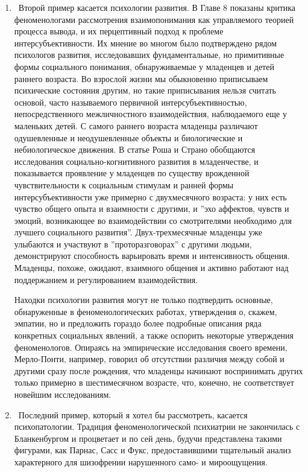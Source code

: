 \documentclass[11pt]{book}
\begin{document}
\begin{enumerate}
  \item\ Второй пример касается психологии развития. В Главе 8 показаны критика феноменологами рассмотрения взаимопонимания как управляемого теорией процесса вывода, и их перцептивный подход к проблеме интерсубъективности. Их мнение во многом было подтверждено рядом психологов развития, исследовавших фундаментальные, но примитивные формы социального понимания, обнаруживаемые у младенцев и детей раннего возраста. Во взрослой жизни мы обыкновенно приписываем психические состояния другим, но такие приписывания нельзя считать основой, часто называемого первичной интерсубъективностью, непосредственного межличностного взаимодействия, наблюдаемого еще у маленьких детей. С самого раннего возраста младенцы различают одушевленные и неодушевленные объекты и биологические и небиологическое движения. В статье Роша и Страно обобщаются исследования социально-когнитивного развития в младенчестве, и показывается проявление у младенцев по существу врожденной чувствительности к социальным стимулам и ранней формы интерсубъективности уже примерно с двухмесячного возраста: у них есть чувство общего опыта и взаимности с другими, и ''эхо аффектов, чувств и эмоций, возникающее во взаимодействии со смотрителями необходимо для лучшего социального развития''. Двух-трехмесячные младенцы уже улыбаются и участвуют в ''проторазговорах'' с другими людьми, демонстрируют способность варьировать время и интенсивность общения. Младенцы, похоже, ожидают, взаимного общения и активно работают над поддержанием и регулированием взаимодействия.

Находки психологии развития могут не только подтвердить основные, обнаруженные в феноменологических работах, утверждения о, скажем, эмпатии, но и предложить гораздо более подробные описания ряда конкретных социальных явлений, а также оспорить некоторые утверждения феноменологов. Опираясь на эмпирические исследования своего времени, Мерло-Понти, например, говорил об отсутствии различия между собой и другими сразу после рождения, что младенцы начинают воспринимать других только примерно в шестимесячном возрасте, что, конечно, не соответствует новейшим исследованиям.

  \item\ Последний пример, который я хотел бы рассмотреть, касается психопатологии. Традиция феноменологической психиатрии не закончилась с Бланкенбургом и процветает и по сей день, будучи представлена такими фигурами, как Парнас, Сасс и Фукс, предоставившими тщательный анализ характерного для шизофрении нарушенного само- и мироощущения.


\end{enumerate}
\end{document}
